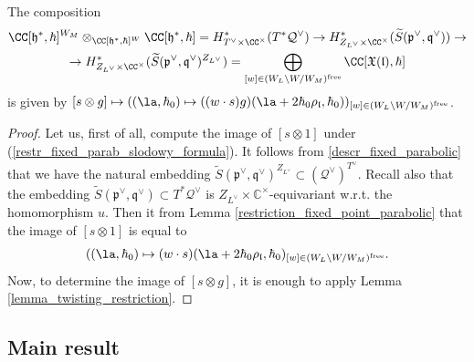 \documentclass[12pt]{amsart}
\begin{document}
\begin{cor}\label{cor_descr_comp_for_slodowy_side}
The composition
\begin{multline}\label{restr_fixed_parab_slodowy_formula}
\CC[\mathfrak{h}^*,\hbar]^{W_M} \otimes_{\CC[\mathfrak{h}^*,\hbar]^W} \CC[\mathfrak{h}^*,\hbar]=H^*_{T^\vee \times \CC^\times}(T^*\mathcal{Q}^\vee) \rightarrow H^*_{Z_{L^\vee} \times \CC^\times}(\widetilde{S}(\mathfrak{p}^\vee,\mathfrak{q}^\vee)) \rightarrow \\
\rightarrow H^*_{Z_{L^\vee} \times \CC^\times}(\widetilde{S}(\mathfrak{p}^\vee,\mathfrak{q}^\vee)^{Z_{L^\vee}})=\bigoplus_{[w] \in (W_L\backslash W/W_{M})^{\mathrm{free}}}\CC[\mathfrak{X}(\mathfrak{l}),\hbar]
\end{multline}
is given by $[s \otimes g] \mapsto ((\la,\hbar_0) \mapsto ((w \cdot s)g)(\la+2\hbar_0\rho_{\mathfrak{l}},\hbar_0))_{[w] \in (W_L\backslash W/W_{M})^{\mathrm{free}}}$. 
\end{cor}
\begin{proof}
Let us, first of all, compute the image of $[s \otimes 1]$ under (\ref{restr_fixed_parab_slodowy_formula}). It follows from \cref{descr_fixed_parabolic} that we have the natural embedding $\widetilde{S}(\mathfrak{p}^\vee,\mathfrak{q}^\vee)^{Z_{L^\vee}} \subset (\mathcal{Q}^\vee)^{T^\vee}$.
Recall also that the embedding $\widetilde{S}(\mathfrak{p}^\vee,\mathfrak{q}^\vee) \subset T^*\mathcal{Q}^\vee$ is $Z_{L^\vee} \times \mathbb{C}^\times$-equivariant w.r.t. the homomorphism $u$.
Then it from Lemma \ref{restriction_fixed_point_parabolic} that the image of $[s \otimes 1]$ is equal to 
\begin{equation*}
((\la,\hbar_0) \mapsto (w \cdot s)(\la+2\hbar_0\rho_{\mathfrak{l}},\hbar_0)_{[w] \in (W_L \backslash W/ W_M)^{\mathrm{free}}}.
\end{equation*}
Now, to determine the image of $[s \otimes g]$, it is enough to apply Lemma \ref{lemma_twisting_restriction}.
\end{proof}



\subsection{Main result}
\end{document}
